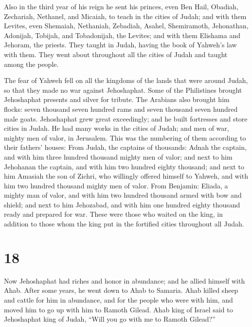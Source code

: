  Also in the third year of his reign he sent his princes,
even Ben Hail, Obadiah, Zechariah, Nethanel, and Micaiah, to teach in
the cities of Judah;  and with them Levites, even
Shemaiah, Nethaniah, Zebadiah, Asahel, Shemiramoth, Jehonathan,
Adonijah, Tobijah, and Tobadonijah, the Levites; and with them Elishama
and Jehoram, the priests.  They taught in Judah, having
the book of Yahweh's law with them. They went about throughout all the
cities of Judah and taught among the people.

 The fear of Yahweh fell on all the kingdoms of the lands
that were around Judah, so that they made no war against Jehoshaphat.
 Some of the Philistines brought Jehoshaphat presents and
silver for tribute. The Arabians also brought him flocks: seven thousand
seven hundred rams and seven thousand seven hundred male goats.
 Jehoshaphat grew great exceedingly; and he built
fortresses and store cities in Judah.  He had many works
in the cities of Judah; and men of war, mighty men of valor, in
Jerusalem.  This was the numbering of them according to
their fathers' houses: From Judah, the captains of thousands: Adnah the
captain, and with him three hundred thousand mighty men of valor;
 and next to him Jehohanan the captain, and with him two
hundred eighty thousand;  and next to him Amasiah the son
of Zichri, who willingly offered himself to Yahweh, and with him two
hundred thousand mighty men of valor.  From Benjamin:
Eliada, a mighty man of valor, and with him two hundred thousand armed
with bow and shield;  and next to him Jehozabad, and with
him one hundred eighty thousand ready and prepared for war.
 These were those who waited on the king, in addition to
those whom the king put in the fortified cities throughout all Judah.

\hypertarget{section-17}{%
\section{18}\label{section-17}}

 Now Jehoshaphat had riches and honor in abundance; and he
allied himself with Ahab.  After some years, he went down
to Ahab to Samaria. Ahab killed sheep and cattle for him in abundance,
and for the people who were with him, and moved him to go up with him to
Ramoth Gilead.  Ahab king of Israel said to Jehoshaphat
king of Judah, ``Will you go with me to Ramoth Gilead?''

